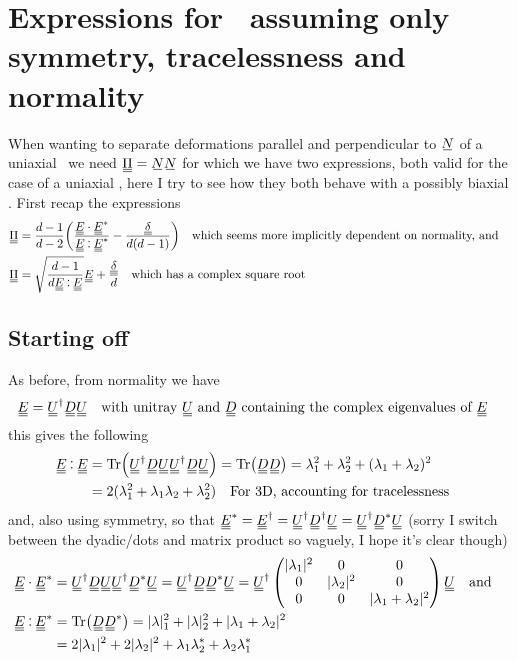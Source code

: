 \documentclass[11pt]{article}
\begin{document}
\section{Expressions for \PP\ assuming only symmetry, tracelessness and normality}
When wanting to separate deformations parallel and perpendicular to $\su{N}$ of a uniaxial \EE\ we need $\du{\Pi} = \su{N}\su{N}$ for which we have two expressions, both valid for the case of a uniaxial \PP, here I try to see how they both behave with a possibly biaxial \EE.
First recap the expressions
\begin{align}
    \du{\Pi} & = \frac{d-1}{d-2}\qty(\frac{\du{E} \cdot \du{E}^*}{\du{E} \cddot \du{E}^*} - \frac{\du{\delta}}{d(d-1)}) \qq{which seems more implicitly dependent on normality, and} \label{eq:piex1}\\
    \du{\Pi} & = \sqrt{\frac{d-1}{d \du{E} \cddot \du{E}}} \du{E} + \frac{\du{\delta}}{d} \label{eq:piex2} \qq{which has a complex square root}
\end{align}

\subsection{Starting off}
As before, from normality we have
\begin{equation}
    \du{E} = \du{U}^\dagger \du{D} \du{U} \qq{with unitray $\du{U}$ and $\du{D}$ containing the complex eigenvalues of \EE}
\end{equation}
    this gives the following
\begin{align}
    \du{E} \cddot \du{E} &= \Tr(\du{U}^\dagger \du{D} \du{U} \du{U}^\dagger \du{D} \du{U}) = \Tr(\du{D}\du{D}) = \lambda_1^2 + \lambda_2^2 + (\lambda_1 + \lambda_2)^2 \\
    &= 2(\lambda_1^2 +\lambda_1\lambda_2 + \lambda_2^2) \qq{For 3D, accounting for tracelessness} \\
\end{align}
and, also using symmetry, so that $\du{E}^* = \du{E}^\dagger = \du{U}^\dagger \du{D}^\dagger \du{U} = \du{U}^\dagger \du{D}^* \du{U}$ (sorry I switch between the dyadic/dots and matrix product so vaguely, I hope it's clear though)
\begin{align}
    \du{E} \cdot \du{E}^* &=  \du{U}^\dagger \du{D} \du{U} \du{U}^\dagger \du{D}^* \du{U} = \du{U}^\dagger \du{D}\du{D}^* \du{U} = \du{U}^\dagger \begin{pmatrix} |\lambda_1|^2 & 0 & 0 \\ 0 & |\lambda_2|^2 & 0 \\ 0 & 0 & |\lambda_1 + \lambda_2|^2 \\ \end{pmatrix} \du{U} \qq{and} \\
    \du{E} \cddot \du{E}^* &=  \Tr(\du{D}\du{D}^*) = |\lambda|_1^2 + |\lambda|_2^2 + |\lambda_1 + \lambda_2|^2 \\
    &= 2|\lambda_1|^2 + 2|\lambda_2|^2 + \lambda_1\lambda_2^* + \lambda_2\lambda_1^*
\end{align}
\end{document}

